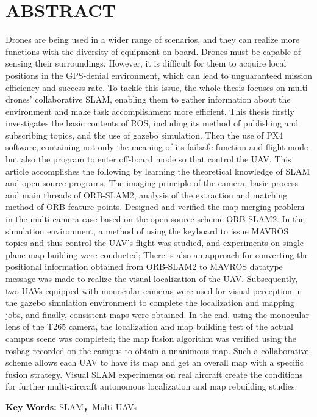 \chapter*{ABSTRACT}
\vspace{1em}
Drones are being used in a wider range of scenarios, and they can realize more functions with the diversity of equipment on board.
Drones must be capable of sensing their surroundings. 
However, it is difficult for them to acquire local positions in the GPS-denial environment, which can lead to unguaranteed mission efficiency and success rate. 
To tackle this issue, the whole thesis focuses on multi drones' collaborative SLAM, enabling them to gather information about the environment and make task accomplishment more efficient.
This thesis firstly investigates the basic contents of ROS, including its method of publishing and subscribing topics, and the use of gazebo simulation.
Then the use of PX4 software, containing not only the meaning of its failsafe function and flight mode but also the program to enter off-board mode so that control the UAV.
This article accomplishes the following by learning the theoretical knowledge of SLAM and open source programs.
The imaging principle of the camera, basic process and main threads of ORB-SLAM2, analysis of the extraction and matching method of ORB feature points.
Designed and verified the map merging problem in the multi-camera case based on the open-source scheme ORB-SLAM2.
In the simulation environment, a method of using the keyboard to issue MAVROS topics and thus control the UAV's flight was studied, and experiments on single-plane map building were conducted; There is also an approach for converting the positional information obtained from ORB-SLAM2 to MAVROS datatype message was made to realize the visual localization of the UAV.
Subsequently, two UAVs equipped with monocular cameras were used for visual perception in the gazebo simulation environment to complete the localization and mapping jobs, and finally, consistent maps were obtained.
In the end, using the monocular lens of the T265 camera, the localization and map building test of the actual campus scene was completed; the map fusion algorithm was verified using the rosbag recorded on the campus to obtain a unanimous map.
Such a collaborative scheme allows each UAV to have its map and get an overall map with a specific fusion strategy. Visual SLAM experiments on real aircraft create the conditions for further multi-aircraft autonomous localization and map rebuilding studies.

\vspace{0.1in}
\noindent \textbf{Key Words:} SLAM，Multi UAVs
